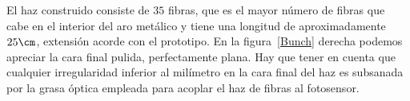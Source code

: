 El haz  construido consiste de $35$ fibras, que es el mayor número de fibras que cabe en el interior del aro metálico y tiene una longitud de aproximadamente $25\cm$, extensión acorde con el prototipo. En la figura~\ref{Bunch} derecha podemos apreciar la cara final pulida, perfectamente plana. Hay que tener en cuenta que cualquier irregularidad inferior al milímetro en la cara final del haz es subsanada por la grasa óptica empleada para acoplar el haz de fibras al fotosensor.
